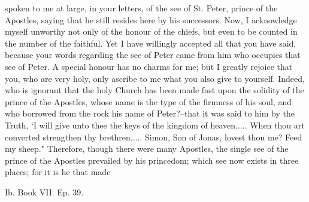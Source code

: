 spoken to me at large, in your letters, of the see of St. Peter, prince of the Apostles, saying that he still resides here by his successors. Now, I acknowledge myself unworthy not only of the honour of the chiefs, but even to be counted in the number of the faithful. Yet I have willingly accepted all that you have said, because your words regarding the see of Peter came from him who occupies that see of Peter. A special honour has no charms for me; but I greatly rejoice that you, who are very holy, only ascribe to me what you also give to yourself. Indeed, who is ignorant that the holy Church has been made fast upon the solidity of the prince of the Apostles, whose name is the type of the firmness of his soul, and who borrowed from the rock his name of Peter?--that it was said to him by the Truth, ‘I will give unto thee the keys of the kingdom of heaven..... When thou art converted strengthen thy brethren..... Simon, Son of Jonas, lovest thou me? Feed my sheep." Therefore, though there were many Apostles, the single see of the prince of the Apostles prevailed by his princedom; which see now exists in three places; for it is he that made

Ib. Book VII. Ep. 39.

